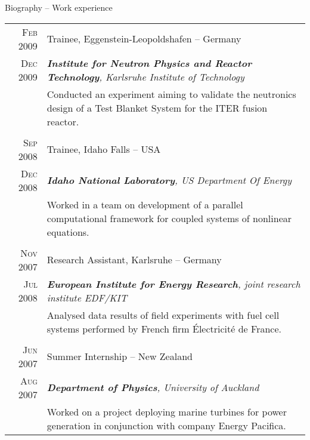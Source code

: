 \begin{frame}{Biography -- Work experience}

\begin{minipage}{5cm}
\scriptsize
\begin{tabular}{r|p{9.5cm}}
\textsc{Feb 2009} & Trainee, Eggenstein-Leopoldshafen -- Germany\\
\textsc{Dec 2009} & \emph{\textbf{Institute for Neutron Physics and Reactor Technology}, Karlsruhe Institute of Technology} \\
& \tiny{Conducted an experiment aiming to validate the neutronics design of a Test Blanket System for the ITER fusion reactor.} \\
\multicolumn{2}{c}{} \\ %
\textsc{Sep 2008} & Trainee, Idaho Falls -- USA\\
\textsc{Dec 2008} & \emph{\textbf{Idaho National Laboratory}, US Department Of Energy} \\
& \tiny{Worked in a team on development of a parallel computational framework for coupled systems of nonlinear equations.} \\
\multicolumn{2}{c}{} \\ %
\textsc{Nov 2007} & Research Assistant, Karlsruhe -- Germany\\
\textsc{Jul 2008} & \emph{\textbf{European Institute for Energy Research}, joint research institute EDF/KIT} \\
& \tiny{Analysed data results of field experiments with fuel cell systems performed by French firm \'Electricit\'e de France.} \\
\multicolumn{2}{c}{} \\ %
\textsc{Jun 2007} & Summer Internship -- New Zealand \\
\textsc{Aug 2007} & \emph{\textbf{Department of Physics}, University of Auckland} \\
& \tiny{Worked on a project deploying marine turbines for power generation in conjunction with company Energy Pacifica.} \\
\end{tabular}
\end{minipage}

\end{frame}